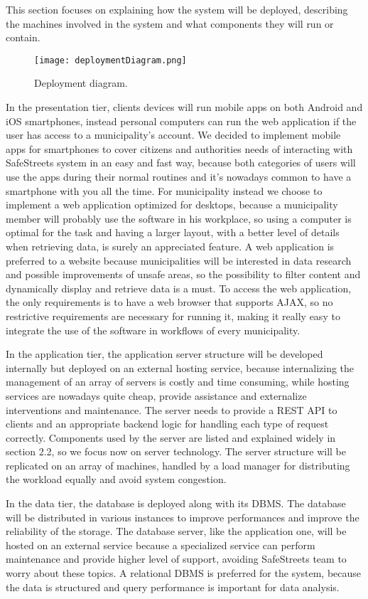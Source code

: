 This section focuses on explaining how the system will be deployed, describing the machines involved in the system and what components they will run or contain.

\begin{figure}[H]
	\centering
	\texttt{[image: deploymentDiagram.png]}
	\caption{Deployment diagram.}
\end{figure}

In the presentation tier, clients devices will run mobile apps on both Android and iOS smartphones, instead personal computers can run the web application if the user has access to a municipality's account. We decided to implement mobile apps for smartphones to cover citizens and authorities needs of interacting with SafeStreets system in an easy and fast way, because both categories of users will use the apps during their normal routines and it's nowadays common to have a smartphone with you all the time. For municipality instead we choose to implement a web application optimized for desktops, because a municipality member will probably use the software in his workplace, so using a computer is optimal for the task and having a larger layout, with a better level of details when retrieving data, is surely an appreciated feature. A web application is preferred to a website because municipalities will be interested in data research and possible improvements of unsafe areas, so the possibility to filter content and dynamically display and retrieve data is a must. To access the web application, the only requirements is to have a web browser that supports AJAX, so no restrictive requirements are necessary for running it, making it really easy to integrate the use of the software in workflows of every municipality.

In the application tier, the application server structure will be developed internally but deployed on an external hosting service, because internalizing the management of an array of servers is costly and time consuming, while hosting services are nowadays quite cheap, provide assistance and externalize interventions and maintenance. The server needs to provide a REST API to clients and an appropriate backend logic for handling each type of request correctly. Components used by the server are listed and explained widely in section 2.2, so we focus now on server technology. The server structure will be replicated on an array of machines, handled by a load manager for distributing the workload equally and avoid system congestion.

In the data tier, the database is deployed along with its DBMS. The database will be distributed in various instances to improve performances and improve the reliability of the storage. The database server, like the application one, will be hosted on an external service because a specialized service can perform maintenance and provide higher level of support, avoiding SafeStreets team to worry about these topics. A relational DBMS is preferred for the system, because the data is structured and query performance is important for data analysis.
